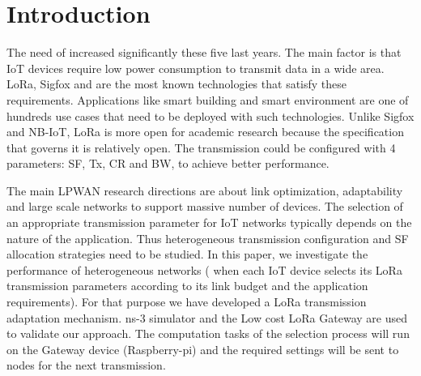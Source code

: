 \section{Introduction} \label{sec:Introduction}

The need of  increased significantly these five last years.
The main factor is that IoT devices require low power consumption to transmit data in a wide area.
LoRa,
	Sigfox and  are the most known technologies that satisfy these requirements.
Applications like smart building and smart environment are one of hundreds use cases that need to be deployed with such technologies.
Unlike Sigfox and NB-IoT,
	LoRa is more open for academic research because the specification that governs it is relatively open.
The transmission could be configured with 4 parameters:
	\ac{SF},
	\ac{Tx},
	\ac{CR} and \ac{BW},
	to achieve better performance.

The main LPWAN research directions are about link optimization,
	adaptability and large scale networks to support massive number of devices.
The selection of an appropriate transmission parameter for IoT networks typically depends on the nature of the application.
Thus heterogeneous transmission configuration and \ac{SF} allocation strategies need to be studied.
In this paper,
	we investigate the performance of heterogeneous networks (\ie\red{,}
when each IoT device selects its LoRa transmission parameters according to its link budget and the application requirements).
For that purpose\red{,} we have developed a LoRa transmission adaptation mechanism.
 ns-3 simulator and the Low cost LoRa Gateway \cite{lowcostloragateway} are used to validate our approach.
The computation tasks of the selection process will run on the Gateway device (Raspberry-pi) and the required settings will be sent to nodes for the next transmission.


